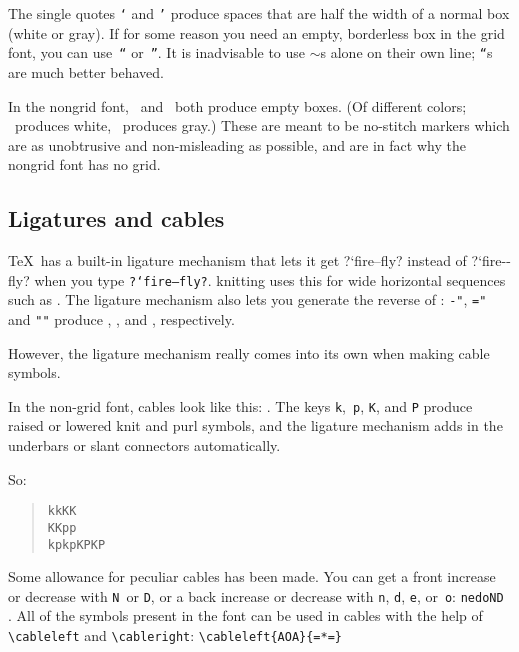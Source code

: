 \documentclass[draft]{amsart}
\begin{document}
The single quotes \texttt{`} and \texttt{'} produce spaces that are {half} the width of a normal box (white or gray). If for some reason you need an empty, borderless box in the grid font, you can use~\texttt{``} or~\texttt{''}. It is inadvisable to use $\sim$s alone on their own line; \texttt{``}s are much better behaved.

In the nongrid font, \ and~\fbox{\texttt{\vphantom{I},}} both produce empty boxes. (Of different colors; ~produces white, \fbox{\texttt{\vphantom{I},}}~produces gray.) These are meant to be no-stitch markers which are as unobtrusive and non-misleading as possible, and are in fact why the nongrid font has no grid.


\subsection{Ligatures and cables}
\label{se:cables}

\TeX\ has a built-in ligature mechanism that lets it get {?`fire--fly?} instead of {?{}`f{}ire-{}-f{}ly?} when you type \texttt{?{}`fire--fly?}. \textsf{knitting} uses this for wide horizontal sequences such as . The ligature mechanism also lets you generate the reverse of : \texttt{-"}, \texttt{="} and \texttt{""} produce , , and , respectively.

However, the ligature mechanism really comes into its own when making cable symbols.

\knitnogrid

In the non-grid font, cables look like this: . The keys \texttt{k},~\texttt{p}, \texttt{K}, and \texttt{P} produce raised or lowered knit and purl symbols, and the ligature mechanism adds in the underbars or slant connectors automatically.

So: 
\begin{quote}
\noindent\hfil\parbox{108pt}{
\tt kkKK\\
KKpp\\
kpkpKPKP}
\parbox{108pt}{}
\end{quote}

Some allowance for peculiar cables has been made. You can get a front increase or decrease with \texttt{N}~or \texttt{D}, or a back increase or decrease with \texttt{n}, \texttt{d}, \texttt{e}, or~\texttt{o}:
\texttt{nedoND} . All of the symbols present in the font can be used in cables with the help of \verb|\cableleft| and \verb|\cableright|: \verb|\cableleft{AOA}{=*=}| 
\end{document}

